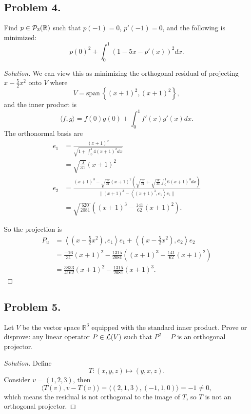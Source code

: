 \documentclass{article}
\newcommand*{\spann}{\ensuremath{\mathrm{span}}\,}
\newcommand*{\R}{\ensuremath{\mathbb{R}}}
\begin{document}
\subsection*{Problem 4.}
Find $p\in {\cal P}_3(\R)$  such that $p(-1)=0$, $p'(-1)=0$, and the following is minimized:
$$p(0)^2+\int_0^1 (1-5x-p'(x))^2 dx.$$
\begin{proof}[Solution]
    We can view this as minimizing the orthogonal residual of projecting $x-\frac{5}{2}x^2$ onto 
    $V$ where $$V = \spann\left\{(x+1)^2,(x+1)^2\right\},$$ 
    and the inner product is 
    $$\langle f,g\rangle=f(0)g(0)+\int_{0}^{1}f'(x)g'(x)dx.$$
    The orthonormal basis are
    \begin{align*}
        e_1 & = \frac{(x+1)^2}{\sqrt{1 + \int_{0}^{1}4(x+1)^2dx}} \\
        & = \sqrt{\frac{3}{31}}(x+1)^2 \\
        e_2 & = \frac{(x+1)^3 - \sqrt{\frac{3}{31}}(x+1)^2\left(\sqrt{\frac{3}{31}} + \sqrt{\frac{3}{31}}\int_{0}^{1}6(x+1)^3dx\right)}
        {\|(x+1)^3-\left\langle(x+1)^3, e_1\right\rangle e_1\|} \\
        & = \sqrt{\frac{620}{2081}}\left((x+1)^3 - \frac{141}{62}(x+1)^2\right).
    \end{align*}
    
    So the projection is 
    \begin{align*}
        P_u & = \left\langle \left(x-\frac{5}{2}x^2\right), e_1\right\rangle e_1 + 
        \left\langle \left(x-\frac{5}{2}x^2\right), e_2\right\rangle e_2 \\
        & = \frac{-16}{31}(x+1)^2 - \frac{1315}{2081}\left((x+1)^3 - \frac{141}{62}(x+1)^2\right) \\
        & = \frac{3833}{4162}(x+1)^2 - \frac{1315}{2081}(x+1)^3.
    \end{align*}
\end{proof}

\newpage
\subsection*{Problem 5.}
Let $V$ be the vector space $\R^3$ equipped with the standard inner product. 
Prove or disprove: any linear operator $P \in {\cal L}(V)$ such that $P^2=P$ is an orthogonal 
projector.
\begin{proof}[Solution]
    Define 
    $$T:(x,y,z)\mapsto(y,x,z).$$
    Consider $v=(1,2,3)$, then 
    $$\langle T(v), v - T(v)\rangle = \langle(2,1,3), (-1,1,0)\rangle = -1\neq 0,$$
    which means the residual is not orthogonal to the image of $T$, so $T$ is not an orthogonal 
    projector.
\end{proof}
\end{document}
